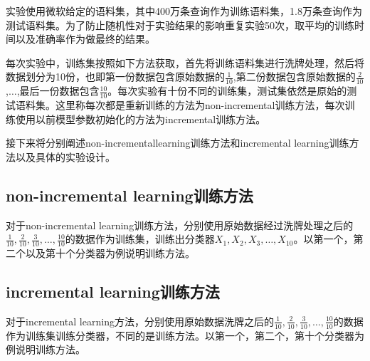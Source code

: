 \documentclass[master]{njuthesis}
\begin{document}
    实验使用微软给定的语料集，其中400万条查询作为训练语料集，1.8万条查询作为测试语料集。为了防止随机性对于实验结果的影响重复实验50次，取平均的训练时间以及准确率作为做最终的结果。

    每次实验中，训练集按照如下方法获取，首先将训练语料集进行洗牌处理，然后将数据划分为10份，也即第一份数据包含原始数据的$\frac{1}{10}$,第二份数据包含原始数据的$\frac{2}{10}$,$\dots$,最后一份数据包含$\frac{10}{10}$。每次实验有十份不同的训练集，测试集依然是原始的测试语料集。这里称每次都是重新训练的方法为non-incremental训练方法，每次训练使用以前模型参数初始化的方法为incremental训练方法。
    
    接下来将分别阐述non-incrementallearning训练方法和incremental learning训练方法以及具体的实验设计。

\subsection{non-incremental learning训练方法}

    对于non-incremental learning训练方法，分别使用原始数据经过洗牌处理之后的$\frac{1}{10},\frac{2}{10},\frac{3}{10},\dots,\frac{10}{10}$的数据作为训练集，训练出分类器$X_1,X_2,X_3,\dots,X_10$。以第一个，第二个以及第十个分类器为例说明训练方法。


\subsection{incremental learning训练方法}
    
    对于incremental learning方法，分别使用原始数据洗牌之后的$\frac{1}{10},\frac{2}{10},\frac{3}{10},\dots,\frac{10}{10}$的数据作为训练集训练分类器，不同的是训练方法。以第一个，第二个，第十个分类器为例说明训练方法。
   

\end{document}
